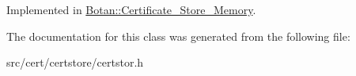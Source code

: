 Implemented in \hyperlink{classBotan_1_1Certificate__Store__Memory_ac4956a93d19b5cfd7e297cdd90c4ac36}{Botan\-::\-Certificate\-\_\-\-Store\-\_\-\-Memory}.



The documentation for this class was generated from the following file\-:\begin{DoxyCompactItemize}
\item 
src/cert/certstore/certstor.\-h\end{DoxyCompactItemize}
